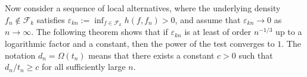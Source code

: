 \documentclass[12pt,letterpaper, twoside, openany]{article}
\theoremstyle{plain}
\newtheorem{theorem}{Theorem}[section]
\begin{document}
Now consider a sequence of local alternatives, where the underlying density $f_n \notin \mathcal{F}_k$ satisfies  
$\varepsilon_{kn} := \inf_{f \in \mathcal{F}_k} h(f, f_n) > 0$, and assume that $\varepsilon_{kn} \to 0$ as $n \to \infty$.  
% 
The following theorem shows that if $\varepsilon_{kn}$ is at least of order $n^{-1/3}$ up to a logarithmic factor and a constant, then the power of the test converges to $1$. The notation $d_n = \Omega(t_n)$ means that there exists a constant $c > 0$ such that $d_n / t_n \geq c$ for all sufficiently large $n$.
\end{document}
